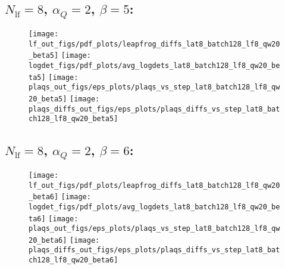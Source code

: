\clearpage
\subsection{\texorpdfstring{$N_{\mathrm{lf}} = 8$}{Nlf = 8}, \texorpdfstring{$\alpha_Q = 2$}{alphaq = 2},
\texorpdfstring{$\beta = 5$}{beta = 5}:}
\begin{figure}[htpb]
  \centering
  \texttt{[image: lf\_out\_figs/pdf\_plots/leapfrog\_diffs\_lat8\_batch128\_lf8\_qw20\_beta5]}
  \hfill
  \texttt{[image: logdet\_figs/pdf\_plots/avg\_logdets\_lat8\_batch128\_lf8\_qw20\_beta5]}
  \hfill
  \texttt{[image: plaqs\_out\_figs/eps\_plots/plaqs\_vs\_step\_lat8\_batch128\_lf8\_qw20\_beta5]}
  \hfill
  \texttt{[image: plaqs\_diffs\_out\_figs/eps\_plots/plaqs\_diffs\_vs\_step\_lat8\_batch128\_lf8\_qw20\_beta5]}
\end{figure}

\clearpage
\subsection{\texorpdfstring{$N_{\mathrm{lf}} = 8$}{Nlf = 8}, \texorpdfstring{$\alpha_Q = 2$}{alphaq = 2},
\texorpdfstring{$\beta = 6$}{beta = 6}:}
%
\begin{figure}[htpb]
  \centering
  \texttt{[image: lf\_out\_figs/pdf\_plots/leapfrog\_diffs\_lat8\_batch128\_lf8\_qw20\_beta6]}
  \hfill
  \texttt{[image: logdet\_figs/pdf\_plots/avg\_logdets\_lat8\_batch128\_lf8\_qw20\_beta6]}
  \hfill
  \texttt{[image: plaqs\_out\_figs/eps\_plots/plaqs\_vs\_step\_lat8\_batch128\_lf8\_qw20\_beta6]}
  \hfill
  \texttt{[image: plaqs\_diffs\_out\_figs/eps\_plots/plaqs\_diffs\_vs\_step\_lat8\_batch128\_lf8\_qw20\_beta6]}
\end{figure}


